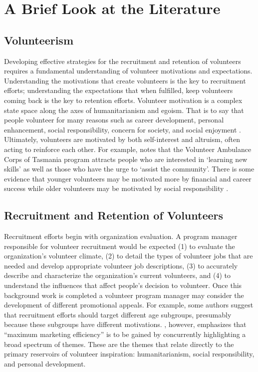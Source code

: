 \documentclass[11pt,fleqn]{book} %
\begin{document}
\chapter{A Brief Look at the Literature}

\section{Volunteerism}
\vspace{1em}

Developing effective strategies for the recruitment and retention of volunteers requires a fundamental understanding of volunteer motivations and expectations. Understanding the motivations that create volunteers is the key to recruitment efforts; understanding the expectations that when fulfilled, keep volunteers coming back is the key to retention efforts. Volunteer motivation is a complex state space along the axes of humanitarianism and egoism. That is to say that people volunteer for many reasons such as career development, personal enhancement, social responsibility, concern for society, and social enjoyment \autocite{shields_young_2009}. Ultimately, volunteers are motivated by both self-interest and altruism, often acting to reinforce each other. For example, \textcite{fahey_training_2002} notes that the Volunteer Ambulance Corps of Tasmania program attracts people who are interested in \enquote*{learning new skills} as well as those who have the urge to \enquote*{assist the community}. There is some evidence that younger volunteers may be motivated more by financial and career success while older volunteers may be motivated by social responsibility \autocite{shields_young_2009}.



\section{Recruitment and Retention of Volunteers}
\vspace{1em}

Recruitment efforts begin with organization evaluation. A program manager responsible for volunteer recruitment would be expected (1) to evaluate the organization's volunteer climate, (2) to detail the types of volunteer jobs that are needed and develop appropriate volunteer job descriptions, (3) to accurately  describe and characterize the organization's current volunteers, and (4) to understand the influences that affect people's decision to volunteer. Once this background work is completed a volunteer program manager may consider the development of different promotional appeals. For example, some authors suggest that recruitment efforts should target different age subgroups, presumably because these subgroups have different motivations. \textcite{shields_young_2009}, however, emphasizes that \enquote{maximum marketing efficiency} is to be gained by concurrently highlighting a broad spectrum of themes. These are the themes that relate directly to the primary reservoirs of volunteer inspiration: humanitarianism, social responsibility, and personal development.
\end{document}
